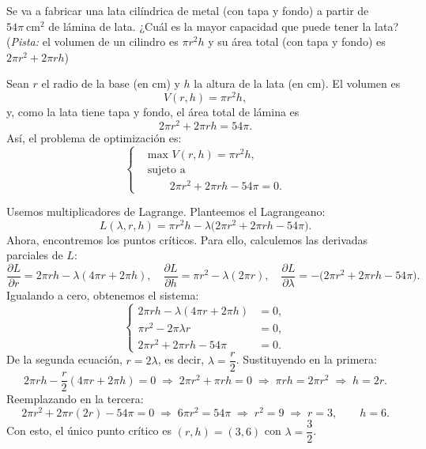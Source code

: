 \documentclass[11pt,respuestas,a4]{aleph-examen}
\begin{document}
\begin{preguntas}
\item
Se va a fabricar una lata cilíndrica de metal (con tapa y fondo) a partir de $54\pi\ \text{cm}^2$ de lámina de lata. ¿Cuál es la mayor capacidad que puede tener la lata? {\footnotesize(\noindent\textit{Pista:} el volumen de un cilindro  es $\pi r^2 h$ y su área total (con tapa y fondo) es $2\pi r^2 + 2\pi r h$)}

\begin{respuesta}
Sean $r$ el radio de la base (en cm) y $h$ la altura de la lata (en cm). El volumen es
\[
    V(r,h) = \pi r^2 h,
\]
y, como la lata tiene tapa y fondo, el área total de lámina es
\[
    2\pi r^2 + 2\pi r h = 54\pi.
\]
Así, el problema de optimización es:
\[
    \left\{
    \begin{aligned}
        &\text{max } V(r,h) = \pi r^2 h,\\
        &\text{sujeto a} \\
        &\qquad 2\pi r^2 + 2\pi r h - 54\pi = 0.
    \end{aligned}
    \right.
\]

Usemos multiplicadores de Lagrange. Planteemos el Lagrangeano:
\[
    L(\lambda,r,h) = \pi r^2 h - \lambda\bigl(2\pi r^2 + 2\pi r h - 54\pi\bigr).
\]
Ahora, encontremos los puntos críticos. Para ello, calculemos las derivadas parciales de $L$:
\[
    \frac{\partial L}{\partial r} = 2\pi r h - \lambda(4\pi r + 2\pi h),\quad
    \frac{\partial L}{\partial h} = \pi r^2 - \lambda(2\pi r),\quad
    \frac{\partial L}{\partial \lambda} = -\bigl(2\pi r^2 + 2\pi r h - 54\pi\bigr).
\]
Igualando a cero, obtenemos el sistema:
\[
    \left\{
    \begin{aligned}
        2\pi r h - \lambda(4\pi r + 2\pi h) &= 0,\\
        \pi r^2 - 2\pi\lambda r &= 0,\\
        2\pi r^2 + 2\pi r h - 54\pi &= 0.
    \end{aligned}
    \right.
\]
De la segunda ecuación, $r = 2\lambda$, es decir, $\lambda = \dfrac{r}{2}$. Sustituyendo en la primera:
\[
    2\pi r h - \frac{r}{2}(4\pi r + 2\pi h)  = 0 
    \;\Longrightarrow\;
    2\pi r^2 + \pi r h = 0
    \;\Longrightarrow\;
    \pi r h = 2\pi r^2
    \;\Longrightarrow\;
    h = 2r.
\]
Reemplazando en la tercera:
\[
    2\pi r^2 + 2\pi r(2r) - 54\pi = 0
    \;\Longrightarrow\;
    6\pi r^2 = 54\pi
    \;\Longrightarrow\;
    r^2 = 9
    \;\Longrightarrow\;
    r = 3,\qquad h = 6.
\]
Con esto, el único punto crítico es $(r,h) = (3,6)$ con $\lambda = \dfrac{3}{2}$.


\end{respuesta}
\end{preguntas}
\end{document}
